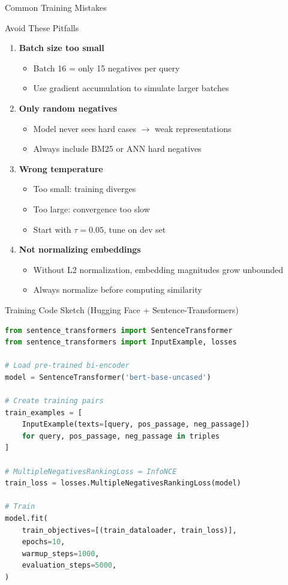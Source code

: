 \documentclass[aspectratio=169]{beamer}
\begin{document}
\begin{frame}{Common Training Mistakes}
\begin{alertblock}{Avoid These Pitfalls}
\begin{enumerate}
    \item \textbf{Batch size too small}
    \begin{itemize}
        \item Batch 16 = only 15 negatives per query
        \item Use gradient accumulation to simulate larger batches
    \end{itemize}

    \item \textbf{Only random negatives}
    \begin{itemize}
        \item Model never sees hard cases $\to$ weak representations
        \item Always include BM25 or ANN hard negatives
    \end{itemize}

    \item \textbf{Wrong temperature}
    \begin{itemize}
        \item Too small: training diverges
        \item Too large: convergence too slow
        \item Start with $\tau = 0.05$, tune on dev set
    \end{itemize}

    \item \textbf{Not normalizing embeddings}
    \begin{itemize}
        \item Without L2 normalization, embedding magnitudes grow unbounded
        \item Always normalize before computing similarity
    \end{itemize}
\end{enumerate}
\end{alertblock}
\end{frame}

\begin{frame}[fragile]{Training Code Sketch (Hugging Face + Sentence-Transformers)}
\begin{lstlisting}[language=Python]
from sentence_transformers import SentenceTransformer
from sentence_transformers import InputExample, losses

# Load pre-trained bi-encoder
model = SentenceTransformer('bert-base-uncased')

# Create training pairs
train_examples = [
    InputExample(texts=[query, pos_passage, neg_passage])
    for query, pos_passage, neg_passage in triples
]

# MultipleNegativesRankingLoss = InfoNCE
train_loss = losses.MultipleNegativesRankingLoss(model)

# Train
model.fit(
    train_objectives=[(train_dataloader, train_loss)],
    epochs=10,
    warmup_steps=1000,
    evaluation_steps=5000,
)
\end{lstlisting}
\end{frame}
\end{document}
